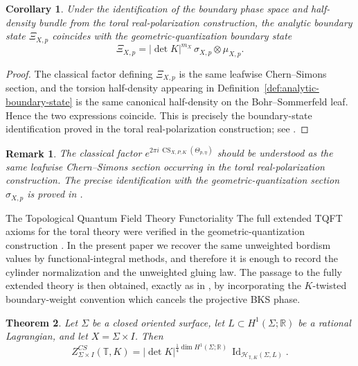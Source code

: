 \documentclass[12pt]{amsart}
\makeatletter
\renewcommand\section{\@startsection{section}{1}%
  \z@{.7\linespacing\@plus\linespacing}{.5\linespacing}%
  {\normalfont\bfseries\centering}}
\renewcommand\subsection{\@startsection{subsection}{2}%
  \z@{.5\linespacing\@plus.7\linespacing}{-.5em}%
  {\normalfont\bfseries}}
\numberwithin{equation}{section}
\newtheorem{theorem}{Theorem}[section]
\newtheorem{corollary}[theorem]{Corollary}
\newtheorem*{remark}{Remark}
\newcommand{\CS}{\operatorname{CS}}
\makeatother
\begin{document}
\begin{corollary}
\label{cor:analytic-equals-gq}
Under the identification of the boundary phase space and half-density bundle from the toral
real-polarization construction, the analytic boundary state \(\Xi_{X,p}\) coincides with the
geometric-quantization boundary state
\[
\Xi_{X,p}=|\det K|^{m_X}\,\sigma_{X,p}\otimes \mu_{X,p}.
\]
\end{corollary}

\begin{proof}
The classical factor defining \(\Xi_{X,p}\) is the same leafwise Chern--Simons section, and the
torsion half-density appearing in Definition~\ref{def:analytic-boundary-state} is the same
canonical half-density on the Bohr--Sommerfeld leaf. Hence the two expressions coincide. This is precisely the boundary-state identification proved in the toral real-polarization
construction; see \cite[Secs.~2--3]{Galviz2}.
\end{proof}


\begin{remark}
The classical factor $e^{2\pi i\,\CS_{X,P,K}(\Theta_{p,\eta})}$
should be understood as the same leafwise Chern--Simons section occurring in the toral real-polarization construction. The precise identification with the geometric-quantization section \(\sigma_{X,p}\) is proved in \cite[Theorem 3.4]{Galviz2}.
\end{remark}


\section{The Topological Quantum Field Theory}
\subsection{Functoriality}
The full extended TQFT axioms for the toral theory were verified in the geometric-quantization construction \cite{Galviz2}. In the present paper we recover the same unweighted bordism values by functional-integral methods, and therefore it is enough to record the cylinder normalization and the unweighted gluing law. The passage to the fully extended theory is then obtained, exactly as in \cite{Galviz2}, by incorporating the \(K\)-twisted boundary-weight convention which cancels the projective BKS phase.

\begin{theorem}
\label{thm:cylinder-toral}
Let \(\Sigma\) be a closed oriented surface, let \(L\subset H^1(\Sigma;\mathbb R)\) be a rational
Lagrangian, and let \(X=\Sigma\times I\). Then
\begin{equation}
\label{eq:cylinder-normalization-toral}
Z^{CS}_{\Sigma\times I}(\mathbb T,K)
=
|\det K|^{\frac14\dim H^1(\Sigma;\mathbb R)}
\,\operatorname{Id}_{\mathcal H_{\mathbb T,K}(\Sigma,L)}.
\end{equation}
\end{theorem}
\end{document}
